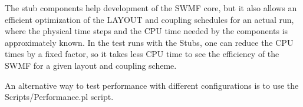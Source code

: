 The stub components help development of the SWMF core, but it also
allows an efficient optimization of the LAYOUT and coupling
schedules for an actual run, where the physical time steps
and the CPU time needed by the components is approximately known.
In the test runs with the Stubs, one can reduce the CPU times by 
a fixed factor, so it takes less CPU time to see the efficiency of the 
SWMF for a given layout and coupling scheme.

An alternative way to test performance with different configurations is
to use the Scripts/Performance.pl script.
